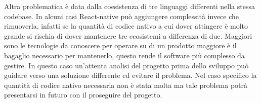 Altra problematica è data dalla coesistenza di tre linguaggi differenti nella stessa codebase. In alcuni casi React-native può aggiungere complessità invece che rimuoverla, infatti se la quantità di codice nativo a cui dover attingere è molto grande si rischia di dover mantenere tre ecosistemi a differenza di due. Maggiori sono le tecnologie da conoscere per operare su di un prodotto maggiore è il bagaglio necessario per mantenerlo, questo rende il software più complesso da gestire. In questo caso un'attenta analisi del progetto prima dello sviluppo può guidare verso una soluzione differente ed evitare il problema. Nel caso specifico la quantità di codice nativo necessaria non è stata molta ma tale problema potrà presentarsi in futuro con il proseguire del progetto.\vspace{5mm}



